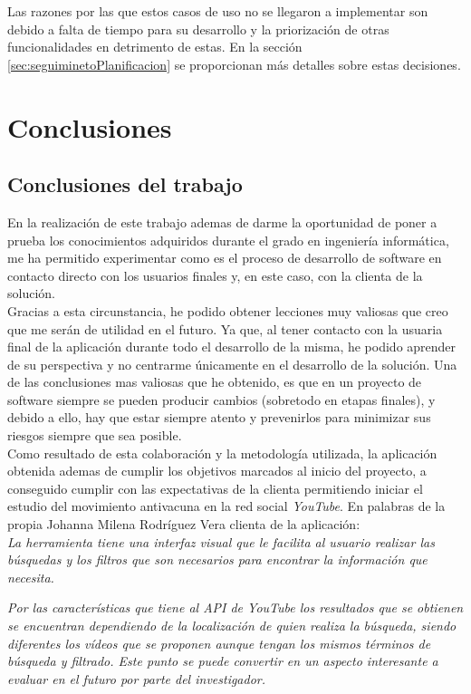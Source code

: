 \documentclass[11pt,a4paper]{article}
\begin{document}
Las razones por las que estos casos de uso no se llegaron a implementar son debido a falta de tiempo para su desarrollo y la priorización de otras funcionalidades en detrimento de estas. En la sección \ref{sec:seguiminetoPlanificacion} se proporcionan más detalles sobre estas decisiones.
\newpage 


\section{Conclusiones}
\bigskip 

\subsection{Conclusiones del trabajo}
En la realización de este trabajo ademas de darme la oportunidad de poner a prueba los conocimientos adquiridos durante el grado en ingeniería informática, me ha permitido experimentar como es el proceso de desarrollo de software en contacto directo con los usuarios finales y, en este caso, con la clienta de la solución.
\\

Gracias a esta circunstancia, he podido obtener lecciones muy valiosas que creo que me serán de utilidad en el futuro. Ya que, al tener contacto con la usuaria final de la aplicación durante todo el desarrollo de la misma, he podido aprender de su perspectiva y no centrarme únicamente en el desarrollo de la solución. Una de las conclusiones mas valiosas que he obtenido, es que en un proyecto de software siempre se pueden producir cambios (sobretodo en etapas finales), y debido a ello, hay que estar siempre atento y prevenirlos para minimizar sus riesgos siempre que sea posible.
\\

Como resultado de esta colaboración y la metodología utilizada, la aplicación obtenida ademas de cumplir los objetivos marcados al inicio del proyecto, a conseguido cumplir con las expectativas de la clienta permitiendo iniciar el estudio del movimiento antivacuna en la red social \textit{YouTube}. En palabras de la propia Johanna Milena Rodríguez Vera clienta de la aplicación:
\\

\textit{La herramienta tiene una interfaz visual que le facilita al usuario realizar las búsquedas y los filtros que son necesarios para encontrar la información que necesita.}

\textit{Por las características que tiene al API de YouTube los resultados que se obtienen se encuentran  dependiendo de la localización de quien realiza la búsqueda, siendo diferentes los vídeos que se proponen aunque tengan los mismos términos de búsqueda y filtrado. Este punto se puede convertir en un aspecto interesante a evaluar en el futuro por parte del investigador.}
\end{document}
